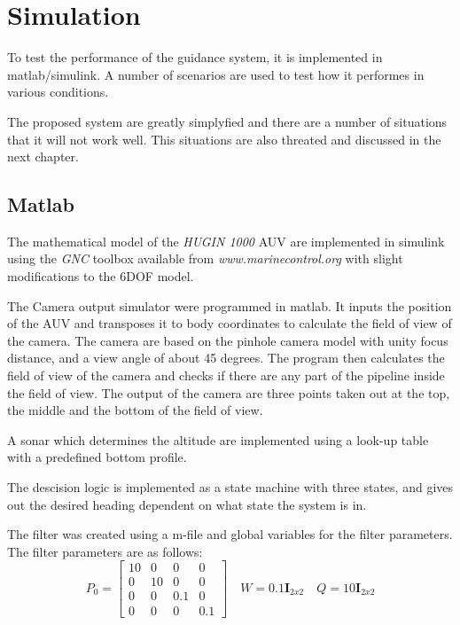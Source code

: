 \chapter{Simulation}
	To test the performance of the guidance system, it is implemented in matlab/simulink. A number of
	scenarios are used to test how it performes in various conditions.

	The proposed system are greatly simplyfied and there are a number of situations that it will not work
	well. This situations are also threated and discussed in the next chapter. 
	

\section{Matlab}
	The mathematical model of the \textit{HUGIN 1000} AUV are implemented in simulink using the
	\textit{GNC} toolbox available from \textit{www.marinecontrol.org} with slight modifications to the
	6DOF model.

	The Camera output simulator were programmed in matlab. It inputs the position of the AUV and
	transposes it to body coordinates to calculate the field of view of the camera. The camera are based
	on the pinhole camera model with unity focus distance, and a view angle of about 45 degrees. The
	program then calculates the field of view of the camera and checks if there are any part of the
	pipeline inside the field of view. The output of the camera are three points taken out at the top, the
	middle and the bottom of the field of view.

	A sonar which determines the altitude are implemented using a look-up table with a predefined bottom
	profile.

	The descision logic is implemented as a state machine with three states, and gives out the 
	desired heading dependent on what state the system is in.

	The filter was created using a m-file and global variables for the filter parameters. The filter
	parameters are as follows:
	\begin{equation}
		P_0 = \left [ \begin{matrix}
				10 & 0 & 0 & 0 \\
				0 & 10 & 0 & 0 \\
				0 & 0 & 0.1 & 0 \\
				0 & 0 & 0 & 0.1
				\end{matrix} \right] \quad
		W = 0.1 \mathbf{I}_{2x2} \quad Q = 10 \mathbf{I}_{2x2} 
	\end{equation}

